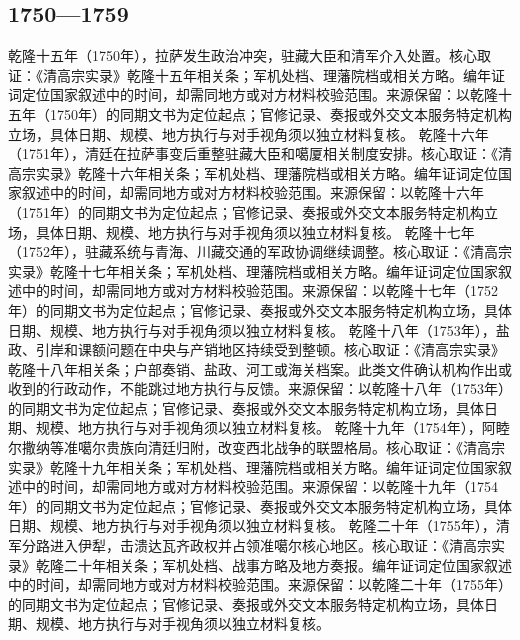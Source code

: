 \subsection{1750—1759}
乾隆十五年（1750年），拉萨发生政治冲突，驻藏大臣和清军介入处置。核心取证：《清高宗实录》乾隆十五年相关条；军机处档、理藩院档或相关方略。编年证词定位国家叙述中的时间，却需同地方或对方材料校验范围。来源保留：以乾隆十五年（1750年）的同期文书为定位起点；官修记录、奏报或外交文本服务特定机构立场，具体日期、规模、地方执行与对手视角须以独立材料复核。
乾隆十六年（1751年），清廷在拉萨事变后重整驻藏大臣和噶厦相关制度安排。核心取证：《清高宗实录》乾隆十六年相关条；军机处档、理藩院档或相关方略。编年证词定位国家叙述中的时间，却需同地方或对方材料校验范围。来源保留：以乾隆十六年（1751年）的同期文书为定位起点；官修记录、奏报或外交文本服务特定机构立场，具体日期、规模、地方执行与对手视角须以独立材料复核。
乾隆十七年（1752年），驻藏系统与青海、川藏交通的军政协调继续调整。核心取证：《清高宗实录》乾隆十七年相关条；军机处档、理藩院档或相关方略。编年证词定位国家叙述中的时间，却需同地方或对方材料校验范围。来源保留：以乾隆十七年（1752年）的同期文书为定位起点；官修记录、奏报或外交文本服务特定机构立场，具体日期、规模、地方执行与对手视角须以独立材料复核。
乾隆十八年（1753年），盐政、引岸和课额问题在中央与产销地区持续受到整顿。核心取证：《清高宗实录》乾隆十八年相关条；户部奏销、盐政、河工或海关档案。此类文件确认机构作出或收到的行政动作，不能跳过地方执行与反馈。来源保留：以乾隆十八年（1753年）的同期文书为定位起点；官修记录、奏报或外交文本服务特定机构立场，具体日期、规模、地方执行与对手视角须以独立材料复核。
乾隆十九年（1754年），阿睦尔撒纳等准噶尔贵族向清廷归附，改变西北战争的联盟格局。核心取证：《清高宗实录》乾隆十九年相关条；军机处档、理藩院档或相关方略。编年证词定位国家叙述中的时间，却需同地方或对方材料校验范围。来源保留：以乾隆十九年（1754年）的同期文书为定位起点；官修记录、奏报或外交文本服务特定机构立场，具体日期、规模、地方执行与对手视角须以独立材料复核。
乾隆二十年（1755年），清军分路进入伊犁，击溃达瓦齐政权并占领准噶尔核心地区。核心取证：《清高宗实录》乾隆二十年相关条；军机处档、战事方略及地方奏报。编年证词定位国家叙述中的时间，却需同地方或对方材料校验范围。来源保留：以乾隆二十年（1755年）的同期文书为定位起点；官修记录、奏报或外交文本服务特定机构立场，具体日期、规模、地方执行与对手视角须以独立材料复核。
